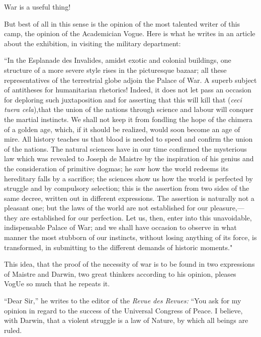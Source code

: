 \documentclass{book}
\begin{document}
War is a useful thing!

But best of all in this sense is the opinion of the most talented writer of this camp, the opinion of the Academician Vogue. Here is what he writes in an article about the exhibition, in visiting the military department:

“In the Esplanade des Invalides, amidst exotic and colonial buildings, one structure of a more severe style rises in the picturesque bazaar; all these representatives of the terrestrial globe adjoin the Palace of War. A superb subject of antitheses for humanitarian rhetorics! Indeed, it does not let pass an occasion for deploring such juxtaposition and for asserting that this will kill that (\emph{ceci tuera cela}),\footnotemark[1] that the union of the nations through science and labour will conquer the martial instincts. We shall not keep it from fondling the hope of the chimera of a golden age, which, if it should be realized, would soon become an age of mire. All history teaches us that blood is needed to speed and confirm the union of the nations. The natural sciences have in our time confirmed the mysterious law which was revealed to Joseph de Maistre by the inspiration of his genius and the consideration of primitive dogmas; he saw how the world redeems its hereditary falls by a sacrifice; the sciences show us how the world is perfected by struggle and by compulsory selection; this is the assertion from two sides of the same decree, written out in different expressions. The assertion is naturally not a pleasant one; but the laws of the world are not established for our pleasure,—they are established for our perfection. Let us, then, enter into this unavoidable, indispensable Palace of War; and we shall have occasion to observe in what manner the most stubborn of our instincts, without losing anything of its force, is transformed, in submitting to the different demands of historic moments."

This idea, that the proof of the necessity of war is to be found in two expressions of Maistre and Darwin, two great thinkers according to his opinion, pleases VogUe so much that he repeats it.

“Dear Sir,” he writes to the editor of the \emph{Revue des Revues:} “You ask for my opinion in regard to the success of the Universal Congress of Peace. I believe, with Darwin, that a violent struggle is a law of Nature, by which all beings are ruled.
\end{document}
